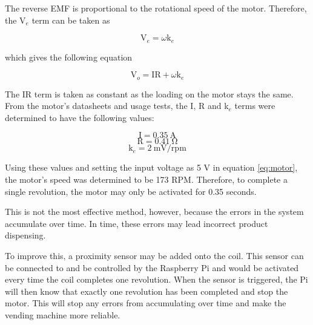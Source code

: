 The reverse EMF is proportional to the rotational speed of the motor. Therefore,
the V$_e$ term can be taken as

\[ \mathrm{V}_e = \omega\mathrm{k}_e\]

which gives the following equation

\begin{equation}
 \label{eq:motor}
 \mathrm{V}_o = \mathrm{IR} + \omega\mathrm{k}_e
\end{equation}

The IR term is taken as constant as the loading on the motor stays the same.
From the motor's datasheets and usage tests, the I, R and k$_e$ terms were
determined to have the following values:

\[\mathrm{I} = 0.35\mathrm{\ A}\]
\[\mathrm{R} = 0.41\mathrm{\ \Omega}\]
\[ \mathrm{k}_e = 2 \mathrm{\ mV/rpm}\]

Using these values and setting the input voltage as 5 V in equation \ref{eq:motor},
the motor's speed was determined to be 173 RPM. Therefore, to complete a single
revolution, the motor may only be activated for 0.35 seconds. 

This is not the most effective method, however, because the errors in the system
accumulate over time. In time, these errors may lead incorrect product
dispensing. 

To improve this, a proximity sensor may be added onto the coil. This sensor can
be connected to and be controlled by the Raspberry Pi and would be activated
every time the coil completes one revolution. When the sensor is triggered, the
Pi will then know that exactly one revolution has been completed and stop the
motor. This will stop any errors from accumulating over time and make the
vending machine more reliable. 
